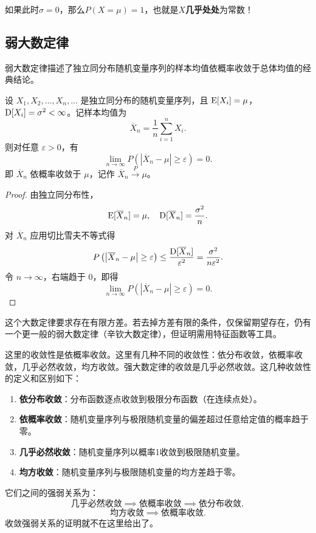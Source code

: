 如果此时$\sigma = 0$，那么$P(X=\mu) =1$，也就是$X$\textbf{几乎处处}为常数！

\subsection{弱大数定律}
弱大数定律描述了独立同分布随机变量序列的样本均值依概率收敛于总体均值的经典结论。

\begin{theorem}[弱大数定律]
设 \(X_1, X_2, \dots, X_n, \dots\) 是独立同分布的随机变量序列，且 \(\operatorname{E}[X_i]=\mu\)，\(\operatorname{D}[X_i]=\sigma^2 < \infty\)。记样本均值为
\[
\overline{X}_n = \frac{1}{n} \sum_{i=1}^n X_i.
\]
则对任意 \(\varepsilon > 0\)，有
\[
\lim_{n \to \infty} P\left( \left| \overline{X}_n - \mu \right| \ge \varepsilon \right) = 0.
\]
即 \(\overline{X}_n\) 依概率收敛于 \(\mu\)，记作 \(\overline{X}_n \stackrel{P}{\longrightarrow} \mu\)。
\end{theorem}

\begin{proof}
    
由独立同分布性，
\[
\operatorname{E}[\overline{X}_n] = \mu, \quad \operatorname{D}[\overline{X}_n] = \frac{\sigma^2}{n}.
\]
对 \(\overline{X}_n\) 应用切比雪夫不等式得
\[
P\left( \left| \overline{X}_n - \mu \right| \ge \varepsilon \right) \le \frac{\operatorname{D}[\overline{X}_n]}{\varepsilon^2} = \frac{\sigma^2}{n \varepsilon^2}.
\]
令 \(n \to \infty\)，右端趋于 \(0\)，即得
\[
\lim_{n \to \infty} P\left( \left| \overline{X}_n - \mu \right| \ge \varepsilon \right) = 0.
\]
\end{proof}

\begin{attention}
这个大数定律要求存在有限方差。若去掉方差有限的条件，仅保留期望存在，仍有一个更一般的弱大数定律（辛钦大数定律），但证明需用特征函数等工具。
\end{attention}

\begin{attention}
这里的收敛性是依概率收敛。这里有几种不同的收敛性：依分布收敛，依概率收敛，几乎必然收敛，均方收敛。强大数定律的收敛是几乎必然收敛。这几种收敛性的定义和区别如下：

\begin{enumerate}
    \item \textbf{依分布收敛}：分布函数逐点收敛到极限分布函数（在连续点处）。
    \item \textbf{依概率收敛}：随机变量序列与极限随机变量的偏差超过任意给定值的概率趋于零。
    \item \textbf{几乎必然收敛}：随机变量序列以概率1收敛到极限随机变量。
    \item \textbf{均方收敛}：随机变量序列与极限随机变量的均方差趋于零。
\end{enumerate}

它们之间的强弱关系为：
\[
\text{几乎必然收敛} \implies \text{依概率收敛} \implies \text{依分布收敛},
\]
\[
\text{均方收敛} \implies \text{依概率收敛}.
\]
收敛强弱关系的证明就不在这里给出了。

\end{attention}

